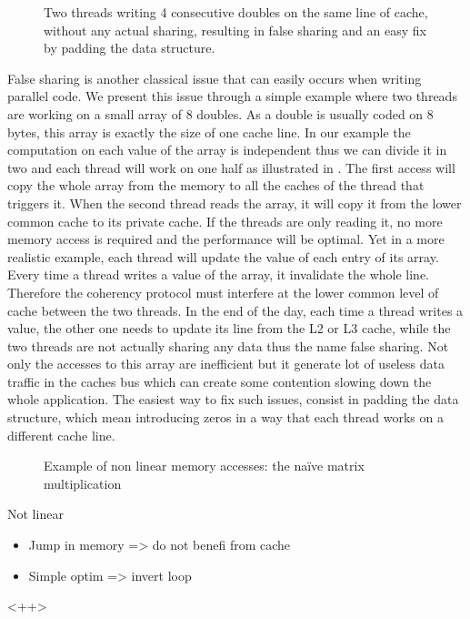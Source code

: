 \begin{figure}[htb]
    \centering
    
    \caption[Example of false sharing.]{Two threads writing 4 consecutive doubles on the same line of cache, without any actual sharing, resulting in false sharing and an easy fix by padding the data structure.}
    \label{fig:false-sharing}
\end{figure}

False sharing is another classical issue that can easily occurs when writing parallel code.
We present this issue through a simple example where two threads are working on a small array of $8$ doubles.
As a double is usually coded on $8$ bytes, this array is exactly the size of one cache line.
In our example the computation on each value of the array is independent thus we can divide it in two and each thread will  work on one half as illustrated in .
The first access will copy the whole array from the memory to all the caches of the thread that triggers it.
When the second thread reads the array, it will copy it from the lower common cache to its private cache.
If the threads are only reading it, no more memory access is required and the performance will be optimal.
Yet in a more realistic example, each thread will update the value of each entry of its array.
Every time a thread writes a value of the array, it invalidate the whole line.
Therefore the coherency protocol must interfere at the lower common level of cache between the two threads.
In the end of the day, each time a thread writes a value, the other one needs to update its line from the L2 or L3 cache, while the two threads are not actually sharing any data thus the name false sharing.
Not only the accesses to this array are inefficient but it generate lot of useless data traffic in the caches bus which can create some contention slowing down the whole application.
The easiest way to fix such issues, consist in padding the data structure, which mean introducing zeros in a way that each thread works on a different cache line.

\begin{figure}[htb]
    \centering
    
    \caption{Example of non linear memory accesses: the naïve matrix multiplication}
    \label{fig:mat-mult}
\end{figure}

Not linear
\begin{itemize}
    \item Jump in memory => do not benefi from cache
    \item Simple optim => invert loop
\end{itemize}<++>

